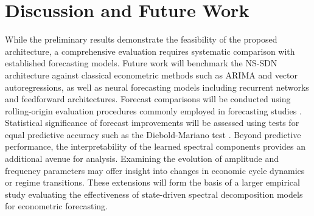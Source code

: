 \section{Discussion and Future Work}
While the preliminary results demonstrate the feasibility of the proposed architecture, a comprehensive evaluation requires systematic comparison with established forecasting models. Future work will benchmark the NS-SDN architecture against classical econometric methods such as ARIMA and vector autoregressions, as well as neural forecasting models including recurrent networks and feedforward architectures.
Forecast comparisons will be conducted using rolling-origin evaluation procedures commonly employed in forecasting studies \cite{west1996predictive}. Statistical significance of forecast improvements will be assessed using tests for equal predictive accuracy such as the Diebold-Mariano test \cite{diebold1995accuracy}.
Beyond predictive performance, the interpretability of the learned spectral components provides an additional avenue for analysis. Examining the evolution of amplitude and frequency parameters may offer insight into changes in economic cycle dynamics or regime transitions.
These extensions will form the basis of a larger empirical study evaluating the effectiveness of state-driven spectral decomposition models for econometric forecasting.
